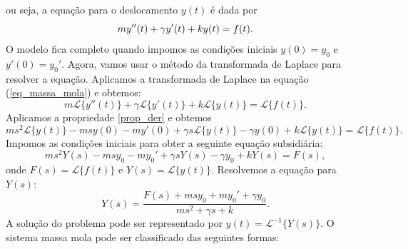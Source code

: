 ou seja, a equação para o deslocamento $y(t)$ é dada por
\begin{equation}{\label{eq_massa_mola}}
my''(t)+\gamma y'(t)+ky(t)=f(t).
\end{equation}
O modelo fica completo quando impomos as condições iniciais $y(0)=y_0$ e $y'(0)=y_0'$.
Agora, vamos usar o método da transformada de Laplace para resolver a equação. Aplicamos a transformada de Laplace na equação (\ref{eq_massa_mola}) e obtemos:
\begin{equation}
m\mathcal{L}\{y''(t)\}+\gamma \mathcal{L}\{y'(t)\}+k\mathcal{L}\{y(t)\}=\mathcal{L}\{f(t)\}.
\end{equation}
Aplicamos a propriedade \ref{prop_der} e obtemos
\begin{equation}
ms^2\mathcal{L}\{y(t)\}-msy(0)-my'(0)+\gamma s\mathcal{L}\{y(t)\}-\gamma y(0)+k\mathcal{L}\{y(t)\}=\mathcal{L}\{f(t)\}.
\end{equation}
Impomos as condições iniciais para obter a seguinte equação subsidiária:
\begin{equation}
ms^2Y(s)-msy_0-my_0'+\gamma sY(s)-\gamma y_0+kY(s)=F(s),
\end{equation}
onde $F(s)=\mathcal{L}\{f(t)\}$ e $Y(s)=\mathcal{L}\{y(t)\}$. Resolvemos a equação para $Y(s)$:
\begin{equation}
Y(s)=\frac{F(s)+msy_0+my_0'+\gamma y_0}{ms^2+\gamma s +k}.
\end{equation}
A solução do problema pode ser representado por $y(t)=\mathcal{L}^{-1}\{Y(s)\}$.
O sistema massa mola pode ser classificado das seguintes formas:
